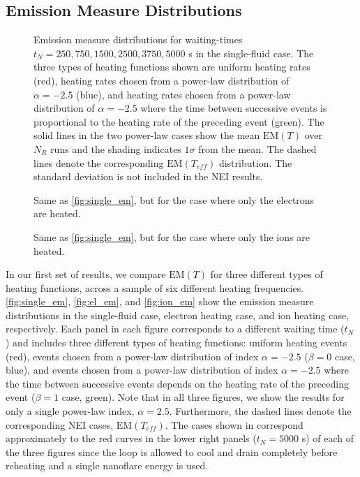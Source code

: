 \documentclass[preprint,linenumbers]{aastex}
\begin{document}
	\subsection{Emission Measure Distributions}
	\label{subsec:em_dist}
	\begin{figure*}[t]
		\caption{Emission measure distributions for waiting-times $t_N=250,750,1500,2500,3750,5000$ s in the single-fluid case. The three types of heating functions shown are uniform heating rates (red), heating rates chosen from a power-law distribution of $\alpha=-2.5$ (blue), and heating rates chosen from a power-law distribution of $\alpha=-2.5$ where the time between successive events is proportional to the heating rate of the preceding event (green). The solid lines in the two power-law cases show the mean $\mathrm{EM}(T)$ over $N_R$ runs and the shading indicates $1\sigma$ from the mean. The dashed lines denote the corresponding $\mathrm{EM}(T_{eff})$ distribution. The standard deviation is not included in the NEI results.}
		\label{fig:single_em}
	\end{figure*}
	\begin{figure*}[t]
		\caption{Same as \autoref{fig:single_em}, but for the case where only the electrons are heated.}
		\label{fig:el_em}
	\end{figure*}
	\begin{figure*}
		\caption{Same as \autoref{fig:single_em}, but for the case where only the ions are heated.}
		\label{fig:ion_em}
	\end{figure*}
	\par In our first set of results, we compare $\mathrm{EM}(T)$ for three different types of heating functions, across a sample of six different heating frequencies. \autoref{fig:single_em}, \autoref{fig:el_em}, and \autoref{fig:ion_em} show the emission measure distributions in the single-fluid case, electron heating case, and ion heating case, respectively. Each panel in each figure corresponds to a different waiting time ($t_N$) and includes three different types of heating functions: uniform heating events (red), events chosen from a power-law distribution of index $\alpha=-2.5$ ($\beta=0$ case, blue), and events chosen from a power-law distribution of index $\alpha=-2.5$ where the time between successive events depends on the heating rate of the preceding event ($\beta=1$ case, green). Note that in all three figures, we show the results for only a single power-law index, $\alpha=2.5$. Furthermore, the dashed lines denote the corresponding NEI cases, $\mathrm{EM}(T_{eff})$. The cases shown in  correspond approximately to the red curves in the lower right panels ($t_N=5000$ s) of each of the three figures since the loop is allowed to cool and drain completely before reheating and a single nanoflare energy is used. 
\end{document}
